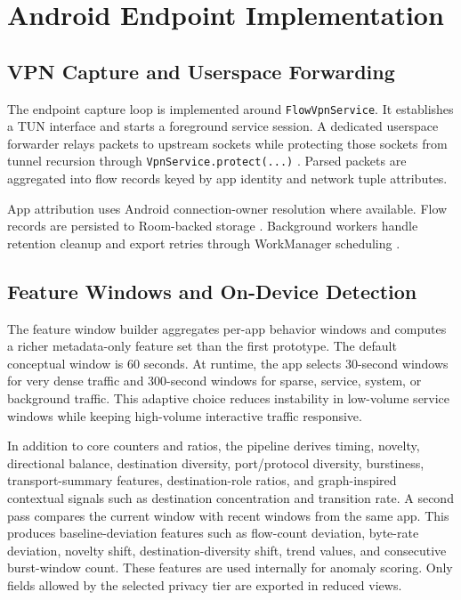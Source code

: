 \section{Android Endpoint Implementation}
\subsection{VPN Capture and Userspace Forwarding}
The endpoint capture loop is implemented around \texttt{FlowVpnService}. It establishes a TUN
interface and starts a foreground service session. A dedicated userspace forwarder relays packets to
upstream sockets while protecting those sockets from tunnel recursion through
\texttt{VpnService.protect(...)} \citep{android_vpnservice}. Parsed packets are aggregated into flow
records keyed by app identity and network tuple attributes.

App attribution uses Android connection-owner resolution where available. Flow records are
persisted to Room-backed storage \citep{android_room}. Background workers handle retention cleanup
and export retries through WorkManager scheduling \citep{android_workmanager}.

\subsection{Feature Windows and On-Device Detection}
The feature window builder aggregates per-app behavior windows and computes a richer metadata-only
feature set than the first prototype. The default conceptual window is 60 seconds. At runtime, the
app selects 30-second windows for very dense traffic and 300-second windows for sparse, service,
system, or background traffic. This adaptive choice reduces instability in low-volume service
windows while keeping high-volume interactive traffic responsive.

In addition to core counters and ratios, the pipeline derives timing, novelty, directional balance,
destination diversity, port/protocol diversity, burstiness, transport-summary features,
destination-role ratios, and graph-inspired contextual signals such as destination concentration and
transition rate. A second pass compares the current window with recent windows from the same app.
This produces baseline-deviation features such as flow-count deviation, byte-rate deviation,
novelty shift, destination-diversity shift, trend values, and consecutive burst-window count. These
features are used internally for anomaly scoring. Only fields allowed by the selected privacy tier
are exported in reduced views.

